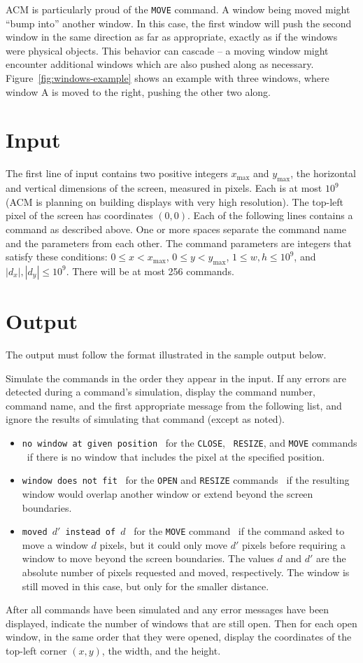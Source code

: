 ACM is particularly proud of the {\tt MOVE} command.
A window being moved might ``bump into'' another window.
In this case, the first window will push the second window in the
same direction as far as appropriate,
exactly as if the windows were physical objects.
This behavior can cascade -- a moving window might encounter
additional windows which are also pushed along as necessary.
Figure~\ref{fig:windows-example} shows an example with three
windows, where window A is moved to the right, pushing the other
two along.


\section*{Input}
The first line of input contains two positive integers $x_{\max}$
and $y_{\max}$, the horizontal and vertical dimensions of the screen,
measured in pixels.  
Each is at most $10^9$ (ACM is planning on building displays with
very high resolution).
The top-left pixel of the screen has coordinates $(0,0)$.
Each of the following lines contains a command as described above.
One or more spaces separate the command name
and the parameters from each other.
The command parameters are integers that satisfy these conditions:
$0 \leq x < x_{\max}$,
$0 \leq y < y_{\max}$,
$1 \leq w,h \leq 10^9$, and
$|d_x|,|d_y| \leq 10^9$.
There will be at most 256 commands.

\section*{Output}
The output must follow the format illustrated in the sample output below.

Simulate the commands in the order they appear in the input.
If any errors are detected during a command's simulation,
display the command number, command name, and the first appropriate message 
from the following list,
and ignore the results of simulating that command (except as noted).

\begin{itemize}
\setlength{\itemsep}{0.0in}
\item {\tt no window at given position} \textemdash\ for the {\tt CLOSE}, {\tt
  RESIZE}, and {\tt MOVE} commands \textemdash\ if there is no window
  that includes the pixel at the specified position.
\item {\tt window does not fit} \textemdash\ for the
  {\tt OPEN} and {\tt RESIZE} commands
  \textemdash\ if the resulting window would overlap another window
  or extend beyond the screen boundaries.
\item {\tt moved $d'$ instead of $d$} \textemdash\ for the {\tt MOVE} command
  \textemdash\ if the command asked to move a window $d$ pixels,
  but it could only move $d'$
  pixels before requiring a window to move beyond the screen boundaries.
  The values $d$ and $d'$ are the absolute number of pixels requested and moved,
  respectively.
  The window is still moved in this case,
  but only for the smaller distance.
\end{itemize}

After all commands have been simulated and any error messages have been
displayed, indicate the number of windows that are still open.
Then for each open window,
in the same order that they were opened,
display the coordinates of the top-left corner $(x,y)$,
the width, and the height.
